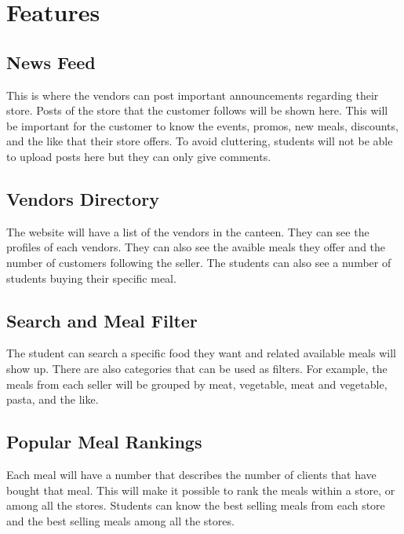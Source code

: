\documentclass{article}
\author{Jonel C. Ganalon}
\date{19 March 2024}
\begin{document}
\section{Features}
\subsection{News Feed}
This is where the vendors can post important announcements regarding their store. Posts of the store that the customer follows will be shown here. This will be important for the customer to know the events, promos, new meals, discounts, and the like that their store offers. To avoid cluttering, students will not be able to upload posts here but they can only give comments.

\subsection{Vendors Directory}
The website will have a list of the vendors in the canteen. They can see the profiles of each vendors. They can also see the avaible meals they offer and the number of customers following the seller. The students can also see a number of students buying their specific meal. 

\subsection{Search and Meal Filter}
The student can search a specific food they want and related available meals will show up. There are also categories that can be used as filters. For example, the meals from each seller will be grouped by meat, vegetable, meat and vegetable, pasta, and the like.

\subsection{Popular Meal Rankings}
Each meal will have a number that describes the number of clients that have bought that meal. This will make it possible to rank the meals within a store, or among all the stores. Students can know the best selling meals from each store and the best selling meals among all the stores.
\end{document}
